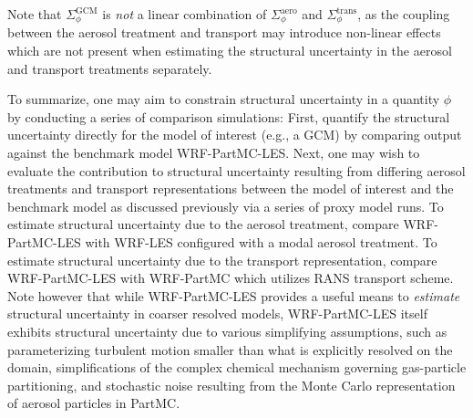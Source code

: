 Note that $\Sigma^{\text{GCM}}_{\phi}$ is \textit{not} a linear combination of $\Sigma^{\text{aero}}_{\phi}$ and $\Sigma^{\text{trans}}_{\phi}$, as the coupling between the aerosol treatment and transport may introduce non-linear effects which are not present when estimating the structural uncertainty in the aerosol and transport treatments separately. 

To summarize, one may aim to constrain structural uncertainty in a quantity $\phi$ by conducting a series of comparison simulations: First, quantify the structural uncertainty directly for the model of interest (e.g., a GCM) by comparing output against the benchmark model WRF-PartMC-LES. Next, one may wish to evaluate the contribution to structural uncertainty resulting from differing aerosol treatments and transport representations between the model of interest and the benchmark model as discussed previously via a series of proxy model runs. To estimate structural uncertainty due to the aerosol treatment, compare WRF-PartMC-LES with WRF-LES configured with a modal aerosol treatment. To estimate structural uncertainty due to the transport representation, compare WRF-PartMC-LES with WRF-PartMC which utilizes RANS transport scheme. Note however that while WRF-PartMC-LES provides a useful means to \textit{estimate} structural uncertainty in coarser resolved models, WRF-PartMC-LES itself exhibits structural uncertainty due to various simplifying assumptions, such as parameterizing turbulent motion smaller than what is explicitly resolved on the domain, simplifications of the complex chemical mechanism governing gas-particle partitioning, and stochastic noise resulting from the Monte Carlo representation of aerosol particles in PartMC.   


